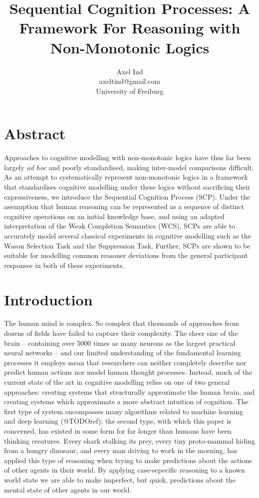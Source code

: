 \documentclass{article}
\begin{document}
\title{Sequential Cognition Processes: A Framework For Reasoning with Non-Monotonic Logics}
\author{Axel Ind \\ axeltind@gmail.com \\ University of Freiburg}

\maketitle

\section*{Abstract}
Approaches to cognitive modelling with non-monotonic logics have thus far been largely \textit{ad hoc} and poorly standardised, making inter-model comparisons difficult. As an attempt to systematically represent non-monotonic logics in a framework that standardises cognitive modelling under these logics without sacrificing their expressiveness, we introduce the Sequential Cognition Process (SCP). Under the assumption that human reasoning can be represented as a sequence of distinct cognitive operations on an initial knowledge base, and using an adapted interpretation of the Weak Completion Semantics (WCS), SCPs are able to accurately model several classical experiments in cognitive modelling such as the Wason Selection Task and the Suppression Task. Further, SCPs are shown to be suitable for modelling common reasoner deviations from the general participant responses in both of these experiments.

\section{Introduction}
The human mind is complex. So complex that thousands of approaches from dozens of fields have failed to capture their complexity. The sheer size of the brain -- containing  over 5000 times as many neurons as the largest practical neural networks \citep{mocanu2018scalable} -- and our limited understanding of the fundamental learning processes it employs mean that researchers can neither completely describe nor predict human actions nor model human thought processes. Instead, much of the current state of the art in cognitive modelling relies on one of two general approaches: creating systems that structurally approximate the human brain, and creating systems which approximate a more abstract intuition of cognition. The first type of system encompasses many algorithms related to machine learning and deep learning (@TODOref); the second type, with which this paper is concerned, has existed in some form for far longer than humans have been thinking creatures. Every shark stalking its prey, every tiny proto-mammal hiding from a hungry dinosaur, and every man driving to work in the morning, has applied this type of reasoning when trying to make predictions about the actions of other agents in their world. By applying case-sepecific reasoning to a known world state we are able to make imperfect, but quick, predictions about the mental state of other agents in our world.
\end{document}
